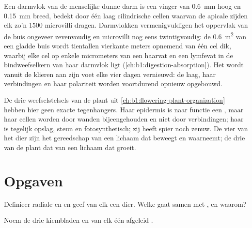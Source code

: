 \begin{example}\label{ex:b1:body-plans-tissues:villus}
Een darmvlok van de menselijke dunne darm is een vinger van \qty{0.6}{mm} hoog
en \qty{0.15}{mm} breed, bedekt door één laag cilindrische cellen waarvan de
apicale zijden elk zo'n \qty{1500}{} microvilli dragen. Darmvlokken
vermenigvuldigen het oppervlak van de buis ongeveer zevenvoudig en microvilli
nog eens twintigvoudig: de \qty{0.6}{m^2} van een gladde buis wordt tientallen
vierkante meters opnemend  van één cel dik, waarbij elke cel op enkele
micrometers van een haarvat en een lymfevat in de bindweefselkern van haar
darmvlok ligt (\cref{ch:b1:digestion-absorption}). Het  wordt vanuit de
klieren aan zijn voet elke vier dagen vernieuwd: de laag, haar verbindingen en
haar polariteit worden voortdurend opnieuw opgebouwd.
\end{example}

\begin{remark}\label{rem:b1:body-plans-tissues:plants}
De drie weefselstelsels van de plant uit
\cref{ch:b1:flowering-plant-organization} hebben hier geen exacte tegenhangers.
Haar epidermis is naar functie een , maar haar cellen worden door wanden
bijeengehouden en niet door verbindingen; haar  is tegelijk opslag,
steun en fotosynthetisch; zij heeft spier noch zenuw. De vier  van het
dier zijn het gereedschap van een lichaam dat beweegt en waarneemt; de drie van
de plant dat van een lichaam dat groeit.
\end{remark}

\section{Opgaven}

\begin{exercise}[$\star$]\label{exo:b1:body-plans-tissues:1}
Definieer radiale en  en geef van elk een dier. Welke gaat
samen met , en waarom?
\end{exercise}

\begin{exercise}[$\star$]\label{exo:b1:body-plans-tissues:2}
Noem de drie kiembladen en van elk één afgeleid .
\end{exercise}

